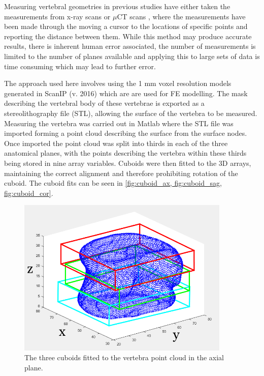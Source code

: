 Measuring vertebral geometries in previous studies have either taken the
measurements from x-ray scans \cite{Gilad1986,Gilad1985} or $\mu$CT scans
\cite{Zhou2000,Cheung1994}, where the measurements have been made through the
moving a cursor to the locations of specific points and reporting the distance
between them.  While this method may produce accurate results, there is
inherent human error associated, the number of measurements is limited to the
number of planes available and applying this to large sets of data is time
consuming which may lead to further error.

The approach used here involves using the 1 mm voxel resolution models
generated in ScanIP (v. 2016) which are are used for FE modelling.  The mask
describing the vertebral body of these vertebrae is exported as a
stereolithography file (STL), allowing the surface of the vertebra to be
measured.  Measuring the vertebra was carried out in Matlab where the STL file
was imported forming a point cloud describing the surface from the surface
nodes.  Once imported the point cloud was split into thirds in each of the
three anatomical planes, with the points describing the vertebra within these
thirds being stored in nine array variables.  Cuboids were then fitted to the
3D arrays, maintaining the correct alignment and therefore prohibiting rotation
of the cuboid.  The cuboid fits can be seen in \cref{fig:cuboid_ax,
fig:cuboid_sag, fig:cuboid_cor}.


\begin{figure}[ht!]
  \centering
  \includegraphics[width=4in]{Chapters/Chapter_PCA_images/Cuboid_fit_axial.png}
  \caption{The three cuboids fitted to the vertebra point cloud in the axial plane.}
  \label{fig:cuboid_ax}
\end{figure}


